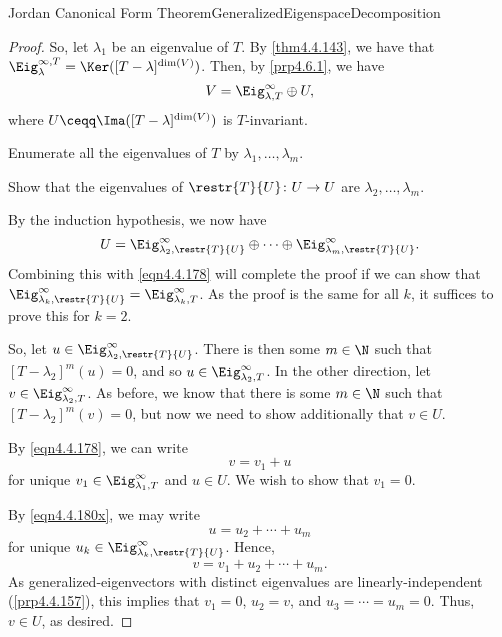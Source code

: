 \begin{thm}{Jordan Canonical Form Theorem}{GeneralizedEigenspaceDecomposition}
\begin{proof}
		So, let $\lambda _1$ be an eigenvalue of $T$.  By \cref{thm4.4.143}, we have that $\Eig _{\lambda}^{\infty ,T}=\Ker ([T-\lambda ]^{\dim (V)})$.  Then, by \cref{prp4.6.1}, we have
		\begin{equation}\label{eqn4.4.178}
			V=\Eig _{\lambda ,T}^{\infty}\oplus U,
		\end{equation}
		where $U\ceqq \Ima ([T-\lambda ]^{\dim (V)})$ is $T$-invariant.
	
		Enumerate all the eigenvalues of $T$ by $\lambda _1,\ldots ,\lambda _m$.
		\begin{exr}[breakable=false]{}{}
			Show that the eigenvalues of $\restr{T}{U}\colon U\rightarrow U$ are $\lambda _2,\ldots ,\lambda _m$.
		\end{exr}
		By the induction hypothesis, we now have
		\begin{equation}\label{eqn4.4.180x}
			U=\Eig _{\lambda _2,\restr{T}{U}}^{\infty}\oplus \cdots \oplus \Eig _{\lambda _m,\restr{T}{U}}^{\infty}.
		\end{equation}
		Combining this with \eqref{eqn4.4.178} will complete the proof if we can show that $\Eig _{\lambda _k,\restr{T}{U}}^{\infty}=\Eig _{\lambda _k,T}^{\infty}$.  As the proof is the same for all $k$, it suffices to prove this for $k=2$.
	
		So, let $u\in \Eig _{\lambda _2,\restr{T}{U}}^{\infty}$.  There is then some $m\in \N$ such that $[T-\lambda _2]^m(u)=0$, and so $u\in \Eig _{\lambda _2,T}^{\infty}$.  In the other direction, let $v\in \Eig _{\lambda _2,T}^{\infty}$.  As before, we know that there is some $m\in \N$ such that $[T-\lambda _2]^m(v)=0$, but now we need to show additionally that $v\in U$.
	
		By \eqref{eqn4.4.178}, we can write
		\begin{equation}\label{eqn4.4.181}
			v=v_1+u
		\end{equation}
		for unique $v_1\in \Eig _{\lambda _1,T}^{\infty}$ and $u\in U$.  We wish to show that $v_1=0$.
	
		By \eqref{eqn4.4.180x}, we may write
		\begin{equation}
			u=u_2+\cdots +u_m
		\end{equation} 
		for unique $u_k\in \Eig _{\lambda _k,\restr{T}{U}}^{\infty}$.  Hence,
		\begin{equation}
			v=v_1+u_2+\cdots +u_m.
		\end{equation}
		As generalized-eigenvectors with distinct eigenvalues are linearly-independent (\cref{prp4.4.157}), this implies that $v_1=0$, $u_2=v$, and $u_3=\cdots =u_m=0$.  Thus, $v\in U$, as desired.
		

\end{proof}
\end{thm}

